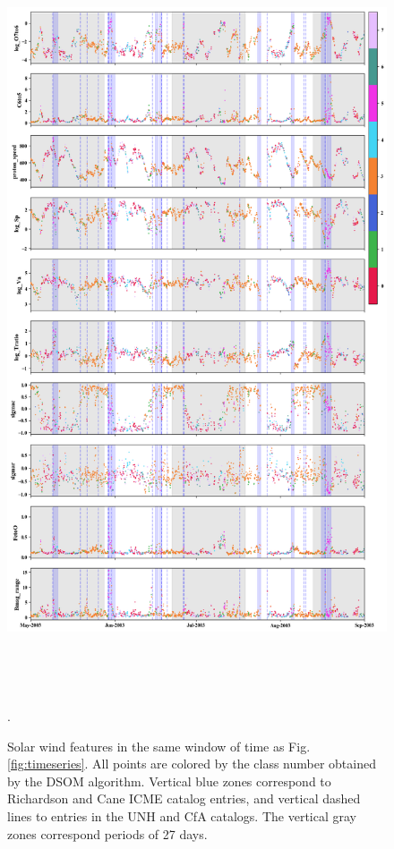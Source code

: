 \documentclass[utf8]{frontiersSCNS} %
\begin{document}
\begin{figure}[h!]
	\begin{center}
		\includegraphics[height=22cm]{Amaya/tsfeatures-som}%
	\end{center}
	\caption{Solar wind features in the same window of time as Fig.\ref{fig:timeseries}. All points are colored by the class number obtained by the DSOM algorithm. Vertical blue zones correspond to Richardson and Cane ICME catalog entries, and vertical dashed lines to entries in the UNH and CfA catalogs. The vertical gray zones correspond periods of 27 days.}\label{fig:tsfeatures-som}.
\end{figure}
\end{document}
